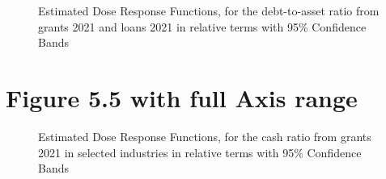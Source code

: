 \begin{figure}
    \centering
    
    \decoRule
    \caption[Response curves for indebtedness through aid uncut]{Estimated Dose Response Functions, for the debt-to-asset ratio from grants 2021 and loans 2021 in relative terms with 95\% Confidence Bands}
    \label{fig:Curve2raw}
\end{figure}



\section{Figure 5.5 with full Axis range}

\begin{figure}
    \centering
    
    \decoRule
    \caption[Response curves for liquidity through aid - by sectors 1 uncut]{Estimated Dose Response Functions, for the cash ratio from grants 2021 in selected industries in relative terms with 95\% Confidence Bands}
    \label{fig:Curve3raw}
\end{figure}



